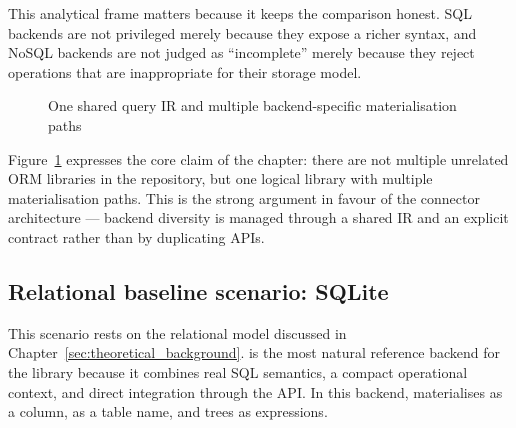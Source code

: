 This analytical frame matters because it keeps the comparison honest. SQL backends are not privileged merely because they expose a richer syntax, and NoSQL backends are not judged as ``incomplete'' merely because they reject operations that are inappropriate for their storage model.

\begin{figure}[H]
\centering
{}
\caption{One shared query IR and multiple backend-specific materialisation paths}
\label{fig:backend_materialisation_paths}
\end{figure}

Figure~\ref{fig:backend_materialisation_paths} expresses the core claim of the chapter: there are not multiple unrelated ORM libraries in the repository, but one logical library with multiple materialisation paths. This is the strong argument in favour of the connector architecture --- backend diversity is managed through a shared IR and an explicit contract rather than by duplicating APIs.

\subsection{Relational baseline scenario: SQLite}

This scenario rests on the relational model discussed in Chapter~\ref{sec:theoretical_background}.  is the most natural reference backend for the library because it combines real SQL semantics, a compact operational context, and direct integration through the  API. In this backend,  materialises as a column,  as a table name, and  trees as  expressions.

